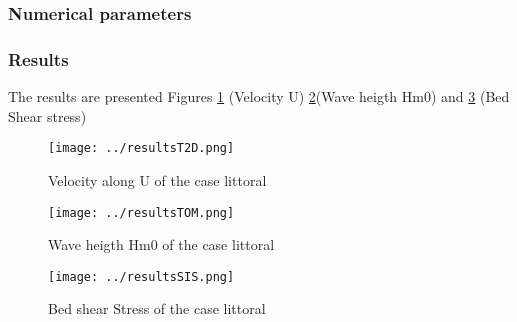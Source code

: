 %
%
\subsubsection{Numerical parameters}
%

%
%
\subsubsection{Results}
%
The results are presented Figures \ref{resultsT2D} (Velocity U) \ref{resultsTOM}(Wave heigth Hm0) and  \ref{resultsSIS} (Bed Shear stress)
\begin{figure} [!h]
\centering
\texttt{[image: ../resultsT2D.png]}
 \caption{Velocity along U of the case littoral}
\label{resultsT2D}
\end{figure}
\begin{figure} [!h]
\centering
\texttt{[image: ../resultsTOM.png]}
 \caption{Wave heigth Hm0 of the case littoral}
\label{resultsTOM}
\end{figure}
\begin{figure} [!h]
\centering
\texttt{[image: ../resultsSIS.png]}
 \caption{Bed shear Stress of the case littoral}
\label{resultsSIS}
\end{figure}



